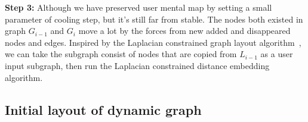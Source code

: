 \textbf{Step 3:} Although we have preserved user mental map by setting a small parameter of cooling step, but it's still far from stable. The nodes both existed in graph $G_{i-1}$ and $G_{i}$ move a lot by the forces from 
new added and disappeared nodes and edges. Inspired by the Laplacian constrained graph layout algorithm~\cite{Yuan:2012:TVCG}, we can take the subgraph consist of nodes that are copied from $L_{i-1}$ as
a user input subgraph, then run the Laplacian constrained distance embedding algorithm. 

\subsection{Initial layout of dynamic graph}

